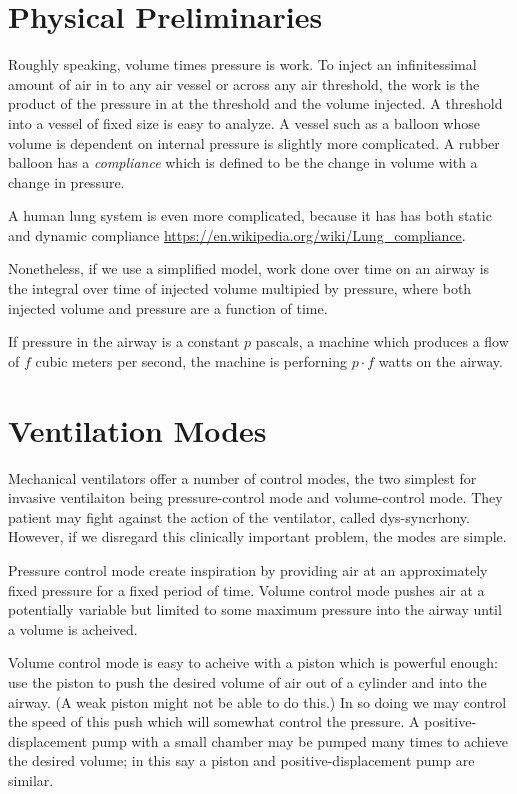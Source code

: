\documentclass{article}
\begin{document}
\section{Physical Preliminaries}

Roughly speaking, volume times pressure is work.
To inject an infinitessimal amount of air in
to any air vessel or across any air threshold,
the work is the product of the pressure in at the threshold and the
volume injected.
A threshold into a vessel of fixed size is easy to analyze.
A vessel such as a balloon whose volume is dependent on internal pressure
is slightly more complicated.
A rubber balloon has a {\em compliance} which is defined to be
the change in volume with a change in pressure.

A human lung system is even more
complicated, because it has has
both static and dynamic compliance \url{https://en.wikipedia.org/wiki/Lung_compliance}.

Nonetheless, if we use a simplified model, work done over time
on an airway is the integral over time of injected volume
multipied by pressure, where both injected volume and
pressure are a function of time.

If pressure in the airway is a constant $p$ pascals, a machine which produces a flow of $f$ cubic meters
per second, the machine is perforning $p \cdot f$ watts on the airway.


\section{Ventilation Modes}

Mechanical ventilators offer a number of control modes, the two
simplest for invasive ventilaiton
being pressure-control mode and volume-control mode.
They patient may fight against the action of the ventilator,
called dys-syncrhony. However, if we disregard this clinically
important problem, the modes are simple.

Pressure control mode create inspiration by providing air
at an approximately fixed pressure for a fixed period of time.
Volume control mode pushes air at a potentially variable but
limited to some maximum pressure into the airway until a volume
is acheived.

Volume control mode is easy to acheive with a piston which is
powerful enough: use the piston to push the desired volume of
air out of a cylinder and into the airway. (A weak piston might
not be able to do this.) In so doing we may control the speed
of this push which will somewhat control the pressure.
A positive-displacement pump with a small chamber may be pumped
many times to achieve the desired volume; in this say a
piston and positive-displacement pump are similar.
\end{document}
